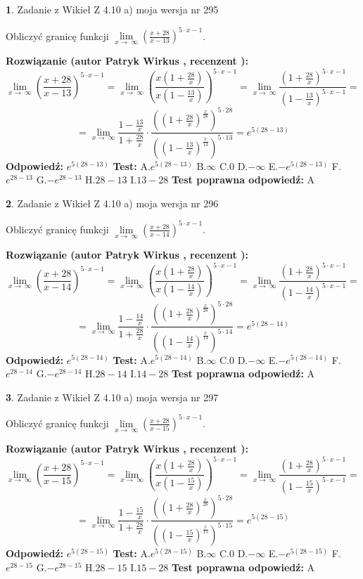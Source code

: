 \documentclass[12pt, a4paper]{article}
\theoremstyle{definition} %
\newtheorem{zad}{}
\newcommand{\zadStart}[1]{\begin{zad}#1\newline}
\newcommand{\zadStop}{\end{zad}}
\newcommand{\rozwStart}[2]{\noindent \textbf{Rozwiązanie (autor #1 , recenzent #2): }\newline}
\newcommand{\rozwStop}{\newline}
\newcommand{\odpStart}{\noindent \textbf{Odpowiedź:}\newline}
\newcommand{\odpStop}{\newline}
\newcommand{\testStart}{\noindent \textbf{Test:}\newline}
\newcommand{\testStop}{\newline}
\newcommand{\kluczStart}{\noindent \textbf{Test poprawna odpowiedź:}\newline}
\newcommand{\kluczStop}{\newline}
\begin{document}
\zadStart{Zadanie z Wikieł Z 4.10 a) moja wersja nr 295}


Obliczyć granicę funkcji  $\lim\limits_{x\to\ \infty}(\frac{x+28}{x-13})^{5\cdot x-1}$.
\zadStop
\rozwStart{Patryk Wirkus}{}
$$\lim\limits_{x\to\ \infty}(\frac{x+28}{x-13})^{5\cdot x-1} = \lim\limits_{x\to\ \infty}(\frac{x(1+\frac{28}{x})}{x(1-\frac{13}{x})})^{5\cdot x-1}=\lim\limits_{x\to\ \infty}\frac{(1+\frac{28}{x})^{5\cdot x-1}}{(1-\frac{13}{x})^{5\cdot x-1}}=$$
$$=\lim\limits_{x\to\ \infty}\frac{1-\frac{13}{x}}{1+\frac{28}{x}}\cdot\frac{((1+\frac{28}{x})^{\frac{x}{28}})^{5\cdot28}}{((1-\frac{13}{x})^{\frac{x}{13}})^{5\cdot13}}=e^{5(28-13)}$$
\rozwStop
\odpStart
$e^{5(28-13)}$
\odpStop
\testStart
A.$e^{5(28-13)}$ B.$\infty$ C.$0$ D.$-\infty$ E.$-e^{5(28-13)}$
F.$e^{28-13}$ G.$-e^{28-13}$
H.$28-13$
I.$13-28$
\testStop
\kluczStart
A
\kluczStop



\zadStart{Zadanie z Wikieł Z 4.10 a) moja wersja nr 296}


Obliczyć granicę funkcji  $\lim\limits_{x\to\ \infty}(\frac{x+28}{x-14})^{5\cdot x-1}$.
\zadStop
\rozwStart{Patryk Wirkus}{}
$$\lim\limits_{x\to\ \infty}(\frac{x+28}{x-14})^{5\cdot x-1} = \lim\limits_{x\to\ \infty}(\frac{x(1+\frac{28}{x})}{x(1-\frac{14}{x})})^{5\cdot x-1}=\lim\limits_{x\to\ \infty}\frac{(1+\frac{28}{x})^{5\cdot x-1}}{(1-\frac{14}{x})^{5\cdot x-1}}=$$
$$=\lim\limits_{x\to\ \infty}\frac{1-\frac{14}{x}}{1+\frac{28}{x}}\cdot\frac{((1+\frac{28}{x})^{\frac{x}{28}})^{5\cdot28}}{((1-\frac{14}{x})^{\frac{x}{14}})^{5\cdot14}}=e^{5(28-14)}$$
\rozwStop
\odpStart
$e^{5(28-14)}$
\odpStop
\testStart
A.$e^{5(28-14)}$ B.$\infty$ C.$0$ D.$-\infty$ E.$-e^{5(28-14)}$
F.$e^{28-14}$ G.$-e^{28-14}$
H.$28-14$
I.$14-28$
\testStop
\kluczStart
A
\kluczStop



\zadStart{Zadanie z Wikieł Z 4.10 a) moja wersja nr 297}


Obliczyć granicę funkcji  $\lim\limits_{x\to\ \infty}(\frac{x+28}{x-15})^{5\cdot x-1}$.
\zadStop
\rozwStart{Patryk Wirkus}{}
$$\lim\limits_{x\to\ \infty}(\frac{x+28}{x-15})^{5\cdot x-1} = \lim\limits_{x\to\ \infty}(\frac{x(1+\frac{28}{x})}{x(1-\frac{15}{x})})^{5\cdot x-1}=\lim\limits_{x\to\ \infty}\frac{(1+\frac{28}{x})^{5\cdot x-1}}{(1-\frac{15}{x})^{5\cdot x-1}}=$$
$$=\lim\limits_{x\to\ \infty}\frac{1-\frac{15}{x}}{1+\frac{28}{x}}\cdot\frac{((1+\frac{28}{x})^{\frac{x}{28}})^{5\cdot28}}{((1-\frac{15}{x})^{\frac{x}{15}})^{5\cdot15}}=e^{5(28-15)}$$
\rozwStop
\odpStart
$e^{5(28-15)}$
\odpStop
\testStart
A.$e^{5(28-15)}$ B.$\infty$ C.$0$ D.$-\infty$ E.$-e^{5(28-15)}$
F.$e^{28-15}$ G.$-e^{28-15}$
H.$28-15$
I.$15-28$
\testStop
\kluczStart
A
\kluczStop
\end{document}
